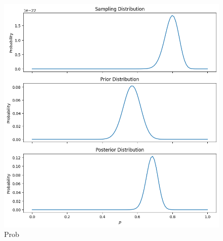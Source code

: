 \begin{figure}[h]
  \begin{center}
    \includegraphics[width=0.6\linewidth]{figures/bayes_p4}
  \end{center}
  \caption{Prob}
  \label{fig:bayes_p4}
\end{figure}

